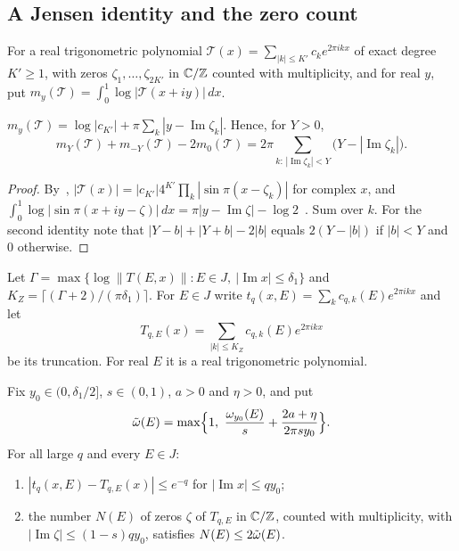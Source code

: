 \subsection{A Jensen identity and the zero count}

For a real trigonometric polynomial $\mathcal T(x)=\sum_{|k|\le K'}c_ke^{2\pi ikx}$ of exact degree $K'\ge1$, with zeros $\zeta_1,\dots,\zeta_{2K'}$ in $\mathbb C/\mathbb Z$ counted with multiplicity, and for real $y$, put $m_y(\mathcal T)=\int_0^1\log|\mathcal T(x+iy)|\,dx$.

\begin{lemma}\label{lem:jensen}
$m_y(\mathcal T)=\log|c_{K'}|+\pi\sum_k|y-\operatorname{Im}\zeta_k|$. Hence, for $Y>0$,
\[
m_Y(\mathcal T)+m_{-Y}(\mathcal T)-2m_0(\mathcal T)=2\pi\sum_{k:\,|\operatorname{Im}\zeta_k|<Y}\bigl(Y-|\operatorname{Im}\zeta_k|\bigr).
\]
\end{lemma}

\begin{proof}
By~\cite[Lemma~7.3(1)]{DMuniv}, $|\mathcal T(x)|=|c_{K'}|4^{K'}\prod_k|\sin\pi(x-\zeta_k)|$ for complex $x$, and $\int_0^1\log|\sin\pi(x+iy-\zeta)|\,dx=\pi|y-\operatorname{Im}\zeta|-\log2$~\cite[proof of Lemma~7.3(2)]{DMuniv}. Sum over $k$. For the second identity note that $|Y-b|+|Y+b|-2|b|$ equals $2(Y-|b|)$ if $|b|<Y$ and $0$ otherwise.
\end{proof}

Let $\Gamma=\max\{\log\|T(E,x)\|:E\in J,\ |\operatorname{Im}x|\le\delta_1\}$ and $K_Z=\lceil(\Gamma+2)/(\pi\delta_1)\rceil$. For $E\in J$ write $t_q(x,E)=\sum_kc_{q,k}(E)e^{2\pi ikx}$ and let
\[
T_{q,E}(x)=\sum_{|k|\le K_Z}c_{q,k}(E)e^{2\pi ikx}
\]
be its truncation. For real $E$ it is a real trigonometric polynomial.

\begin{lemma}\label{lem:zerocount}
Fix $y_0\in(0,\delta_1/2]$, $s\in(0,1)$, $a>0$ and $\eta>0$, and put
\[
\omt(E)=\max\Bigl\{1,\ \frac{\om_{y_0}(E)}{s}+\frac{2a+\eta}{2\pi sy_0}\Bigr\}.
\]
For all large $q$ and every $E\in J$:
\begin{enumerate}
\item $|t_q(x,E)-T_{q,E}(x)|\le e^{-q}$ for $|\operatorname{Im}x|\le qy_0$;
\item the number $N(E)$ of zeros $\zeta$ of $T_{q,E}$ in $\mathbb C/\mathbb Z$, counted with multiplicity, with $|\operatorname{Im}\zeta|\le(1-s)qy_0$, satisfies $N(E)\le2\tilde\omega(E)$.
\end{enumerate}
\end{lemma}


